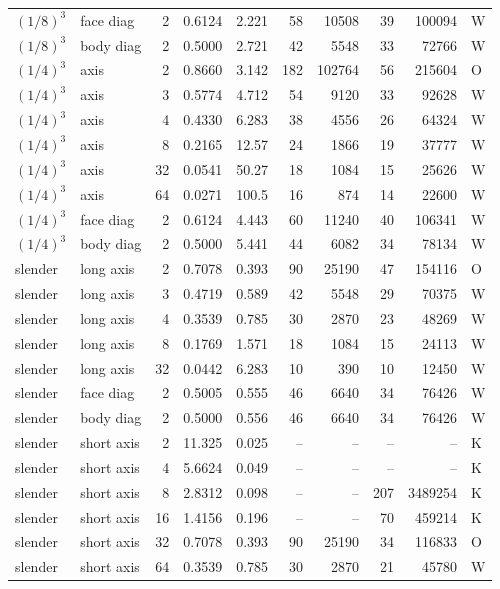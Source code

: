 \begin{center}
\begin{tabular}{@{}llrrrrrrrl@{}}
$(1/8)^3$  & face diag & 2  & 0.6124 & 2.221  & 58  & 10508 & 39 & 100094 & W\\
$(1/8)^3$  & body diag & 2  & 0.5000 & 2.721  & 42  & 5548  & 33 & 72766  & W\\
\midrule
$(1/4)^3$  & axis      & 2  & 0.8660 & 3.142  & 182 & 102764& 56 & 215604 & O\\
$(1/4)^3$  & axis      & 3  & 0.5774 & 4.712  & 54  & 9120  & 33 & 92628  & W\\
$(1/4)^3$  & axis      & 4  & 0.4330 & 6.283  & 38  & 4556  & 26 & 64324  & W\\
$(1/4)^3$  & axis      & 8  & 0.2165 & 12.57  & 24  & 1866  & 19 & 37777  & W\\
$(1/4)^3$  & axis      & 32 & 0.0541 & 50.27  & 18  & 1084  & 15 & 25626  & W\\
$(1/4)^3$  & axis      & 64 & 0.0271 & 100.5  & 16  & 874   & 14 & 22600  & W\\
$(1/4)^3$  & face diag & 2  & 0.6124 & 4.443  & 60  & 11240 & 40 & 106341 & W\\
$(1/4)^3$  & body diag & 2  & 0.5000 & 5.441  & 44  & 6082  & 34 & 78134  & W\\
\midrule
slender & long axis  & 2  & 0.7078 & 0.393 & 90 & 25190 & 47  & 154116  & O\\
slender & long axis  & 3  & 0.4719 & 0.589 & 42 & 5548  & 29  & 70375   & W\\
slender & long axis  & 4  & 0.3539 & 0.785 & 30 & 2870  & 23  & 48269   & W\\
slender & long axis  & 8  & 0.1769 & 1.571 & 18 & 1084  & 15  & 24113   & W\\
slender & long axis  & 32 & 0.0442 & 6.283 & 10 & 390   & 10  & 12450   & W\\
slender & face diag  & 2  & 0.5005 & 0.555 & 46 & 6640  & 34  & 76426   & W\\
slender & body diag  & 2  & 0.5000 & 0.556 & 46 & 6640  & 34  & 76426   & W\\
slender & short axis & 2  & 11.325 & 0.025 & -- & --    & --  & --      & K\\
slender & short axis & 4  & 5.6624 & 0.049 & -- & --    & --  & --      & K\\
slender & short axis & 8  & 2.8312 & 0.098 & -- & --    & 207 & 3489254 & K\\
slender & short axis & 16 & 1.4156 & 0.196 & -- & --    & 70  & 459214  & K\\
slender & short axis & 32 & 0.7078 & 0.393 & 90 & 25190 & 34  & 116833  & O\\
slender & short axis & 64 & 0.3539 & 0.785 & 30 & 2870  & 21  & 45780   & W\\
\bottomrule
\end{tabular}
\end{center}

